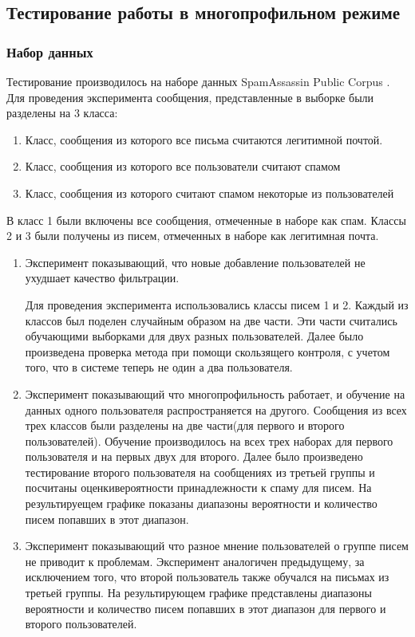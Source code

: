 \subsection{Тестирование работы в многопрофильном режиме}

\subsubsection{Набор данных}
Тестирование производилось на наборе данных SpamAssassin Public Corpus \cite{SAPC}.
Для проведения эксперимента сообщения, представленные в выборке были разделены на 3 класса:
\begin{enumerate}
\item Класс, сообщения из которого все письма считаются легитимной почтой.
\item Класс, сообщения из которого все пользователи считают спамом
\item Класс, сообщения из которого считают спамом некоторые из пользователей
\end{enumerate}

В класс 1 были включены все сообщения, отмеченные в наборе \cite{SAPC} как спам. Классы 2 и 3 были получены из писем, отмеченных в наборе \cite{SAPC} как легитимная почта.
\begin{enumerate}
	\item Эксперимент показывающий, что новые добавление пользователей не ухудшает качество фильтрации.

	Для проведения эксперимента использовались классы писем 1 и 2. Каждый из классов был поделен случайным образом на две части. Эти части считались обучающими выборками для двух разных пользователей. Далее было произведена проверка метода при помощи скользящего контроля, с учетом того, что в системе теперь не один а два пользователя.

	\item Эксперимент показывающий что многопрофильность работает, и обучение на данных одного пользователя распространяется на другого. Сообщения из всех трех классов были разделены на две части(для первого и второго пользователей). Обучение производилось на всех трех наборах для первого пользователя и на первых двух для второго. Далее было произведено тестирование второго пользователя на сообщениях из третьей группы и посчитаны оценкивероятности принадлежности к спаму для писем. На результируещем графике показаны диапазоны вероятности и количество писем попавших в этот диапазон.

	\item Эксперимент показывающий что разное мнение пользователей о группе писем не приводит к проблемам. Эксперимент аналогичен предыдущему, за исключением того, что второй пользователь также обучался на письмах из третьей группы. На результирующем графике представлены диапазоны вероятности и количество писем попавших в этот диапазон для первого и второго пользователей. 
	
\end{enumerate}

